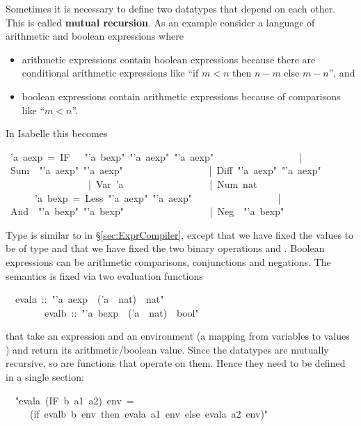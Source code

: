\begin{isabelle}%
%
\begin{isamarkuptext}%
Sometimes it is necessary to define two datatypes that depend on each
other. This is called \textbf{mutual recursion}. As an example consider a
language of arithmetic and boolean expressions where
\begin{itemize}
\item arithmetic expressions contain boolean expressions because there are
  conditional arithmetic expressions like ``if $m<n$ then $n-m$ else $m-n$'',
  and
\item boolean expressions contain arithmetic expressions because of
  comparisons like ``$m<n$''.
\end{itemize}
In Isabelle this becomes%
\end{isamarkuptext}%
~'a~aexp~=~IF~~~{"}'a~bexp{"}~{"}'a~aexp{"}~{"}'a~aexp{"}\isanewline
~~~~~~~~~~~~~~~~~|~Sum~~{"}'a~aexp{"}~{"}'a~aexp{"}\isanewline
~~~~~~~~~~~~~~~~~|~Diff~{"}'a~aexp{"}~{"}'a~aexp{"}\isanewline
~~~~~~~~~~~~~~~~~|~Var~'a\isanewline
~~~~~~~~~~~~~~~~~|~Num~nat\isanewline
{}~~~~~~'a~bexp~=~Less~{"}'a~aexp{"}~{"}'a~aexp{"}\isanewline
~~~~~~~~~~~~~~~~~|~And~~{"}'a~bexp{"}~{"}'a~bexp{"}\isanewline
~~~~~~~~~~~~~~~~~|~Neg~~{"}'a~bexp{"}%
\begin{isamarkuptext}%
\noindent
Type  is similar to  in \S\ref{sec:ExprCompiler},
except that we have fixed the values to be of type  and that we
have fixed the two binary operations  and . Boolean
expressions can be arithmetic comparisons, conjunctions and negations.
The semantics is fixed via two evaluation functions%
\end{isamarkuptext}%
~~evala~::~{"}'a~aexp~{\isasymRightarrow}~('a~{\isasymRightarrow}~nat)~{\isasymRightarrow}~nat{"}\isanewline
~~~~~~~~evalb~::~{"}'a~bexp~{\isasymRightarrow}~('a~{\isasymRightarrow}~nat)~{\isasymRightarrow}~bool{"}%
\begin{isamarkuptext}%
\noindent
that take an expression and an environment (a mapping from variables  to values
) and return its arithmetic/boolean
value. Since the datatypes are mutually recursive, so are functions that
operate on them. Hence they need to be defined in a single 
section:%
\end{isamarkuptext}%
\isanewline
~~{"}evala~(IF~b~a1~a2)~env~=\isanewline
~~~~~(if~evalb~b~env~then~evala~a1~env~else~evala~a2~env){"}\isanewline

\end{isabelle}

